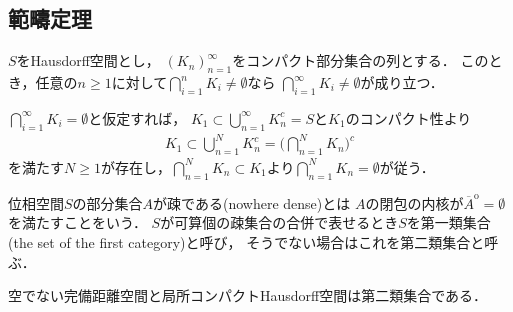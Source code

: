\subsection{範疇定理}
	\begin{screen}
		\begin{thm}[Cantorの共通部分定理]\label{thm:Cantor_intersection_theorem}
			$S$をHausdorff空間とし，
			$(K_n)_{n=1}^\infty$をコンパクト部分集合の列とする．
			このとき，任意の$n \geq 1$に対して$\bigcap_{i=1}^n K_i \neq \emptyset$なら
			$\bigcap_{i=1}^\infty K_i \neq \emptyset$が成り立つ．
		\end{thm}
	\end{screen}
	
	\begin{prf}
		$\bigcap_{i=1}^\infty K_i = \emptyset$と仮定すれば，
		$K_1 \subset \bigcup_{n=1}^\infty K_n^c = S$と$K_1$のコンパクト性より
		\begin{align}
			K_1 \subset \bigcup_{n=1}^N K_n^c = \Biggl( \bigcap_{n=1}^N K_n \Biggr)^c
		\end{align}
		を満たす$N \geq 1$が存在し，$\bigcap_{n=1}^N K_n \subset K_1$より$\bigcap_{n=1}^N K_n = \emptyset$が従う．
		\QED
	\end{prf}
	
	\begin{screen}
		\begin{dfn}
			位相空間$S$の部分集合$A$が疎である(nowhere dense)とは
			$A$の閉包の内核が$\overline{A}^{\mathrm{o}} = \emptyset$を満たすことをいう．
			$S$が可算個の疎集合の合併で表せるとき$S$を第一類集合(the set of the first category)と呼び，
			そうでない場合はこれを第二類集合と呼ぶ．
		\end{dfn}
	\end{screen}
	
	\begin{screen}
		\begin{thm}[Baireの範疇定理]\label{thm:Baire_category_theorem}
			空でない完備距離空間と局所コンパクトHausdorff空間は第二類集合である．
		\end{thm}
	\end{screen}
	
